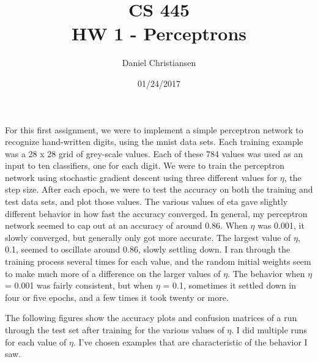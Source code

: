 \documentclass{article}
\title{CS 445 \\ HW 1 - Perceptrons}
\author{Daniel Christiansen}
\date{01/24/2017}
\begin{document}
\maketitle
\clearpage

\begin{flushleft}
For this first assignment, we were to implement a simple perceptron network to recognize hand-written digits, using the mnist data sets.  Each training example was a 28 x 28 grid of grey-scale values.  Each of these 784 values was used as an input to ten classifiers, one for each digit.  We were to train the perceptron network using stochastic gradient descent using three different values for $\eta$, the step size.  After each epoch, we were to test the accuracy on both the training and test data sets, and plot those values.  The various values of eta gave slightly different behavior in how fast the accuracy converged.  In general, my perceptron network seemed to cap out at an accuracy of around 0.86.  When $\eta$ was 0.001, it slowly converged, but generally only got more accurate.  The largest value of $\eta$, 0.1, seemed to oscillate around 0.86, slowly settling down.  I ran through the training process several times for each value, and the random initial weights seem to make much more of a difference on the larger values of $\eta$.  The behavior when $\eta$ = 0.001 was fairly consistent, but when $\eta$ = 0.1, sometimes it settled down in four or five epochs, and a few times it took twenty or more.
\end{flushleft}


\begin{flushleft}
The following figures show the accuracy plots and confusion matrices of a run through the test set after training for the various values of $\eta$.  I did multiple runs for each value of $\eta$.  I've chosen examples that are characteristic of the behavior I saw.
\end{flushleft}

\clearpage

\begin{figure}[h!]
\centering
{}
\end{figure}
\end{document}
